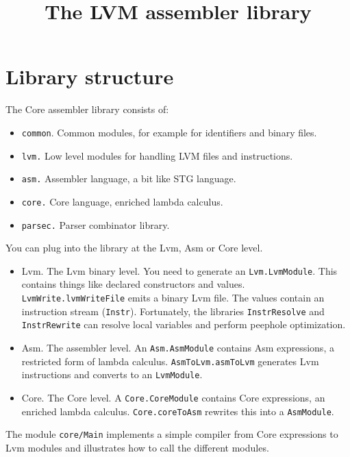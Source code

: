 \documentclass[a4]{article}
\newcommand{\code}[1]{\texttt{#1}}
\begin{document}
\title{The LVM assembler library}
\maketitle

\section{Library structure}

The Core assembler library consists of:

\begin{itemize}
\item \code{common}. Common modules, for example for identifiers and binary files.
\item\code{lvm.}    Low level modules for handling LVM files and instructions.
\item\code{asm.}    Assembler language, a bit like STG language.
\item\code{core.}   Core language, enriched lambda calculus.
\item\code{parsec.} Parser combinator library.
\end{itemize}

You can plug into the library at the Lvm, Asm or Core level.

\begin{itemize}
\item Lvm.  The Lvm binary level. You need to generate an \code{Lvm.LvmModule}.
        This contains things like declared constructors and values.
        \code{LvmWrite.lvmWriteFile} emits a binary Lvm file.
        The values contain an instruction stream (\code{Instr}). Fortunately,
        the libraries \code{InstrResolve} and \code{InstrRewrite} can resolve local
        variables and perform peephole optimization.

\item Asm.  The assembler level. An \code{Asm.AsmModule} contains Asm expressions,
        a restricted form of lambda calculus. \code{AsmToLvm.asmToLvm} generates
        Lvm instructions and converts to an \code{LvmModule}.

\item Core.  The Core level. A \code{Core.CoreModule} contains Core expressions,
        an enriched lambda calculus. \code{Core.coreToAsm} rewrites this into
        a \code{AsmModule}.
\end{itemize}

The module \code{core/Main} implements a simple compiler from Core expressions
to Lvm modules and illustrates how to call the different modules.
\end{document}
